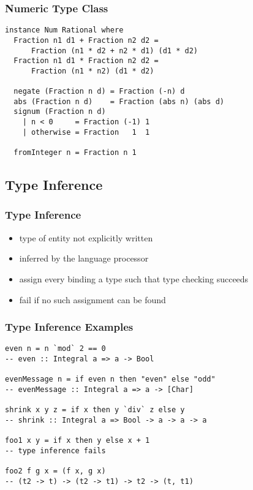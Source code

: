 \documentclass[dvipsnames]{beamer}
\theoremstyle{plain}
\begin{document}
\begin{frame}[fragile]
  \frametitle{Numeric Type Class}

  \begin{exampleblock}{}
    \begin{lstlisting}
instance Num Rational where
  Fraction n1 d1 + Fraction n2 d2 =
      Fraction (n1 * d2 + n2 * d1) (d1 * d2)
  Fraction n1 d1 * Fraction n2 d2 =
      Fraction (n1 * n2) (d1 * d2)

  negate (Fraction n d) = Fraction (-n) d
  abs (Fraction n d)    = Fraction (abs n) (abs d)
  signum (Fraction n d)
    | n < 0     = Fraction (-1) 1
    | otherwise = Fraction   1  1

  fromInteger n = Fraction n 1
    \end{lstlisting}
  \end{exampleblock}
\end{frame}

\subsection{Type Inference}

\begin{frame}
  \frametitle{Type Inference}

  \begin{itemize}
    \item type of entity not explicitly written
    \item inferred by the language processor

    \pause
    \medskip
    \item assign every binding a type such that type checking succeeds
    \item fail if no such assignment can be found
  \end{itemize}
\end{frame}

\begin{frame}[fragile]
  \frametitle{Type Inference Examples}

  \begin{lstlisting}
even n = n `mod` 2 == 0
-- even :: Integral a => a -> Bool

evenMessage n = if even n then "even" else "odd"
-- evenMessage :: Integral a => a -> [Char]

shrink x y z = if x then y `div` z else y
-- shrink :: Integral a => Bool -> a -> a -> a

foo1 x y = if x then y else x + 1
-- type inference fails

foo2 f g x = (f x, g x)
-- (t2 -> t) -> (t2 -> t1) -> t2 -> (t, t1)
  \end{lstlisting}

\end{frame}
\end{document}
